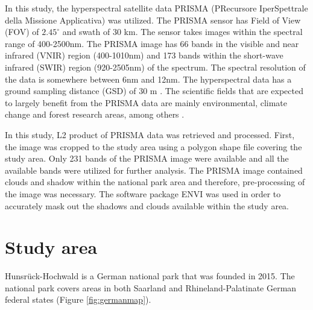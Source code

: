 \documentclass[a4paper, twoside]{templates/ociamthesis}
\begin{document}
In this study, the hyperspectral satellite data PRISMA (PRecursore IperSpettrale della Missione Applicativa) was utilized. The PRISMA sensor has Field of View (FOV) of \(2.45^{\circ}\) and swath of 30 km. The sensor takes images within the spectral range of 400-2500nm. The PRISMA image has 66 bands in the visible and near infrared (VNIR) region (400-1010nm) and 173 bands within the short-wave infrared (SWIR) region (920-2505nm) of the spectrum. The spectral resolution of the data is somewhere between 6nm and 12nm. The hyperspectral data has a ground sampling distance (GSD) of 30 m \citep{candela2016prisma, giardino2020first, verrelst2021mapping}. The scientific fields that are expected to largely benefit from the PRISMA data are mainly environmental, climate change and forest research areas, among others \citep{giardino2020first}.

In this study, L2 product of PRISMA data was retrieved and processed. First, the image was cropped to the study area using a polygon shape file covering the study area. Only 231 bands of the PRISMA image were available and all the available bands were utilized for further analysis. The PRISMA image contained clouds and shadow within the national park area and therefore, pre-processing of the image was necessary. The software package ENVI was used in order to accurately mask out the shadows and clouds available within the study area.

\hypertarget{study-area}{%
\chapter{Study area}\label{study-area}}

Hunsrück-Hochwald is a German national park that was founded in 2015. The national park covers areas in both Saarland and Rhineland-Palatinate German federal states (Figure \ref{fig:germanmap}).
\end{document}
